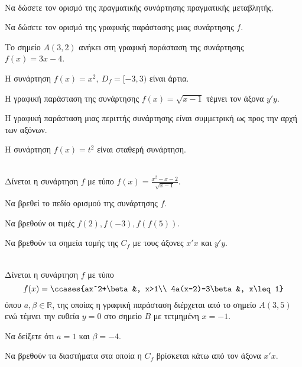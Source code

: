 \documentclass[twoside,nofonts,ektypwsh,math,spyros]{frontisthrio-diag}
\begin{document}
\begin{thema}
\item\mbox{}\\\vspace{-7mm}
\begin{erwthma}
\item Να δώσετε τον ορισμό της πραγματικής συνάρτησης πραγματικής μεταβλητής. 
\item Να δώσετε τον ορισμό της γραφικής παράστασης μιας συνάρτησης $ f $.
\item \swstolathospan
\begin{rlist}
\item Το σημείο $ A(3,2) $ ανήκει στη γραφική παράσταση της συνάρτησης $ f(x)=3x-4 $.
\item Η συνάρτηση $ f(x)=x^2,\ D_f=[-3,3) $ είναι άρτια.
\item Η γραφική παράσταση της συνάρτησης $ f(x)=\sqrt{x-1} $ τέμνει τον άξονα $ y'y $.
\item Η γραφική παράσταση μιας περιττής συνάρτησης είναι συμμετρική ως προς την αρχή των αξόνων.
\item Η συνάρτηση $ f(x)=t^2 $ είναι σταθερή συνάρτηση.
\end{rlist}
\end{erwthma}
\item\mbox{}\\ Δίνεται η συνάρτηση $ f $ με τύπο $ f(x)=\frac{x^2-x-2}{\sqrt{x-1}} $.
\begin{erwthma}
\item Να βρεθεί το πεδίο ορισμού της συνάρτησης $ f $.
\item Να βρεθούν οι τιμές $ f(2),f(-3),f(f(5)) $.
\item Να βρεθούν τα σημεία τομής της $ C_f $ με τους άξονες $ x'x $ και $ y'y $.
\end{erwthma}
\item\mbox{}\\ Δίνεται η συνάρτηση $ f $ με τύπο
\[ f(x)=\ccases{ax^2+\beta &, x>1\\
4a(x-2)-3\beta &, x\leq 1} \]
όπου $ a,\beta\in\mathbb{R} $, της οποίας η γραφική παράσταση διέρχεται από το σημείο $ A(3,5) $ ενώ τέμνει την ευθεία $ y=0 $ στο σημείο $ B $ με τετμημένη $ x=-1 $.
\begin{erwthma}
\item Να δείξετε ότι $ a=1 $ και $ \beta=-4 $.
\item Να βρεθούν τα διαστήματα στα οποία η $ C_f $ βρίσκεται κάτω από τον άξονα $ x'x $.

\end{erwthma}
\end{thema}
\end{document}
